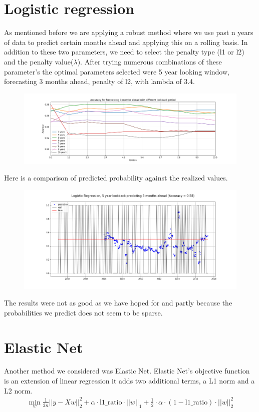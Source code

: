 \documentclass[]{scrartcl}
\begin{document}
\section*{Logistic regression}
As mentioned before we are applying a robust method where we use past n years of data to predict certain months ahead and applying this on a rolling basis. In addition to these two parameters, we need to select the penalty type (l1 or l2) and the penalty value($\lambda$). After trying numerous combinations of these parameter's the optimal parameters selected were 5 year looking window, forecasting 3 months ahead, penalty of l2, with lambda of 3.4. 
\begin{figure}[htb]
	\includegraphics[scale=0.45]{logistic_acf_3month_result.png}
\end{figure}

Here is a comparison of predicted probability against the realized values.
\begin{figure}[htb]
	\includegraphics[scale=0.5]{Logistic_regression_5year_3months_result.png}
\end{figure}
The results were not as good as we have hoped for and partly because the probabilities we predict does not seem to be sparse. 

\section*{Elastic Net}
Another method we considered was Elastic Net. Elastic Net's objective function is an extension of linear regression it adds two additional terms, a L1 norm and a L2 norm.
\begin{align*}
\min_{w} \frac{1}{2n}  ||y - Xw||^2_2+\alpha \cdot \text{l1\_ratio} \cdot ||w||_1 + \frac{1}{2} \cdot \alpha \cdot (1 - \text{l1\_ratio}) \cdot ||w||^2_2
\end{align*}
\end{document}
